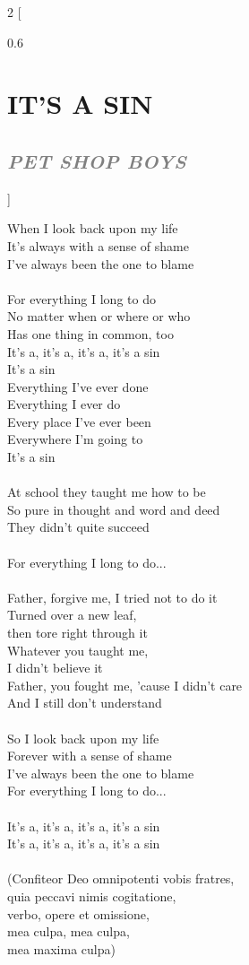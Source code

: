\documentclass[100pt,a4paper]{report}
\newenvironment{song2}[2]
	{	
    	\begin{multicols*}{2}
		[
			\begin{spacing}{0.6}
				\section*{\LARGE\centering \MakeUppercase{\textbf{{#1}}}}
				\subsection*{\Large\centering \textit{\textcolor{gray}{\MakeUppercase{{#2}}}}}
			\end{spacing}
		]
		\Large
	}
	{
	\end{multicols*}
	\newpage
    }
\begin{document}
\begin{song2}{It's A Sin}{Pet Shop Boys}
\noindent
When I look back upon my life\\
It's always with a sense of shame\\
I've always been the one to blame\\
\\
For everything I long to do\\
No matter when or where or who\\
Has one thing in common, too\\
It's a, it's a, it's a, it's a sin\\
It's a sin\\
Everything I've ever done\\
Everything I ever do\\
Every place I've ever been\\
Everywhere I'm going to\\
It's a sin\\
\\
At school they taught me how to be\\
So pure in thought and word and deed\\
They didn't quite succeed\\
\\
For everything I long to do...\\
\\
Father, forgive me, I tried not to do it\\
Turned over a new leaf,\\ 
then tore right through it\\
Whatever you taught me,\\ 
I didn't believe it\\
Father, you fought me, 'cause I didn't care\\
And I still don't understand\\
\\
So I look back upon my life\\
Forever with a sense of shame\\
I've always been the one to blame\\
\vfill
\columnbreak
\noindent
For everything I long to do...\\
\\
It's a, it's a, it's a, it's a sin\\
It's a, it's a, it's a, it's a sin\\
\\
(Confiteor Deo omnipotenti vobis fratres,\\
quia peccavi nimis cogitatione,\\
verbo, opere et omissione,\\ 
mea culpa, mea culpa,\\
mea maxima culpa)
\end{song2}
\end{document}
